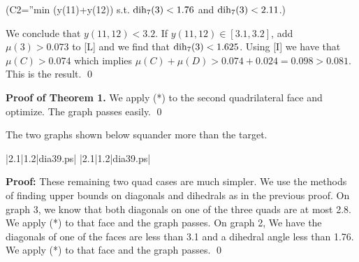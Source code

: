 (C2=''min (y(11)+y(12)) s.t. $\operatorname{dih}_7(3)<1.76$ and $\operatorname{dih}_7(3)<2.11$.)

We conclude that $y(11,12)<3.2$.  If $y(11,12)\in[3.1,3.2]$, add $\mu(3)>0.073$ to [L] and we 
find that $\operatorname{dih}_7(3)<1.625$.  Using [I] we have that $\mu(C)>0.074$ which implies $\mu(C)+\mu(D)>0.074+0.024=0.098>0.081$.
This is the result. \qed

{\bf Proof of Theorem 1.}  We apply (*) to the second
quadrilateral face and optimize.  The graph passes easily.
\qed

 The two graphs shown below squander more than the target.\endproclaim

\gram|2.1|1.2|dia39.ps|  %
\gram|2.1|1.2|dia39.ps|  %

{\bf Proof:} These remaining two quad cases are much simpler.  We use the methods of finding upper bounds on diagonals and dihedrals as in the previous proof.  On graph 3, we know that both diagonals on one of the three quads are at most 2.8.  We apply (*) to that face and the graph passes.  On graph 2, We have the diagonals of one of the faces are less than 3.1 and a dihedral angle less than 1.76.  We apply (*) to that face and the graph passes. \qed

 
\bye






